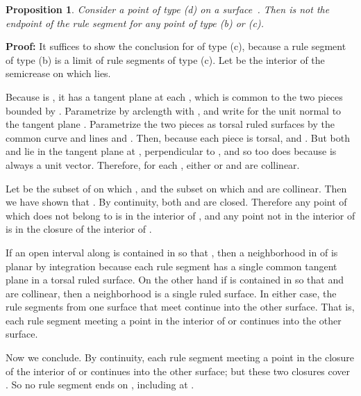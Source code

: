 \documentclass[11pt,letterpaper]{article}
\newtheorem{proposition}[theorem]{Proposition}
\newenvironment{proof}{\noindent\textbf{Proof: }\ignorespaces}
  {\hspace*{\fill}\medskip}
\begin{document}
\begin{proposition}\label{prp:6}
  Consider a point  of type (d) on a surface~.
  Then  is not the endpoint of the rule segment 
  for any point  of type (b) or (c).
\end{proposition}
\begin{proof}
  It suffices to show the conclusion for  of type (c), because a
  rule segment of type (b) is a limit of rule segments of type (c).
  Let  be the interior of the semicrease on which  lies.

  Because  is , it has a tangent plane  at each , which
  is common to the two  pieces bounded by .  Parametrize
   by arclength with , and write  for the
  unit normal to the tangent plane .  Parametrize the
  two pieces as torsal ruled surfaces by the common curve  and lines  and .
  Then, because each piece is torsal,  and
  .  But both  and 
  lie in the tangent plane at , perpendicular to , and so too
  does  because  is always a unit vector.  Therefore,
  for each , either  or  and 
  are collinear.

  Let  be the subset of  on which , and 
  the subset on which  and  are collinear.
  Then we have shown that .  By continuity, both
   and  are closed.  Therefore any point of  which does
  not belong to  is in the interior of , and any point not in
  the interior of  is in the closure of the interior of .

  If an open interval  along  is contained in  so that
  , then a neighborhood in  of  is planar by
  integration because each rule segment has a single common tangent
  plane in a torsal ruled surface.  On the other hand if  is
  contained in  so that  and  are
  collinear, then a neighborhood is a single  ruled surface.  In
  either case, the rule segments from one surface that meet 
  continue into the other surface.  That is, each rule segment meeting
  a point in the interior of  or  continues into the other
  surface.

  Now we conclude.  By continuity, each rule segment meeting a point
  in the closure of the interior of  or  continues into the
  other surface; but these two closures cover .  So no rule
  segment ends on , including at .
\end{proof}
\end{document}
